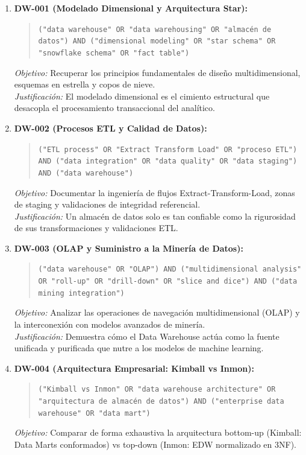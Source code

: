 \begin{enumerate}
  \item \textbf{DW-001 (Modelado Dimensional y Arquitectura Star):}
  \begin{quote}
  \texttt{("data warehouse" OR "data warehousing" OR "almacén de datos") AND ("dimensional modeling" OR "star schema" OR "snowflake schema" OR "fact table")}
  \end{quote}
  \textit{Objetivo:} Recuperar los principios fundamentales de diseño multidimensional, esquemas en estrella y copos de nieve.\\
  \textit{Justificación:} El modelado dimensional es el cimiento estructural que desacopla el procesamiento transaccional del analítico.
  \item \textbf{DW-002 (Procesos ETL y Calidad de Datos):}
  \begin{quote}
  \texttt{("ETL process" OR "Extract Transform Load" OR "proceso ETL") AND ("data integration" OR "data quality" OR "data staging") AND ("data warehouse")}
  \end{quote}
  \textit{Objetivo:} Documentar la ingeniería de flujos Extract-Transform-Load, zonas de staging y validaciones de integridad referencial.\\
  \textit{Justificación:} Un almacén de datos solo es tan confiable como la rigurosidad de sus transformaciones y validaciones ETL.
  \item \textbf{DW-003 (OLAP y Suministro a la Minería de Datos):}
  \begin{quote}
  \texttt{("data warehouse" OR "OLAP") AND ("multidimensional analysis" OR "roll-up" OR "drill-down" OR "slice and dice") AND ("data mining integration")}
  \end{quote}
  \textit{Objetivo:} Analizar las operaciones de navegación multidimensional (OLAP) y la interconexión con modelos avanzados de minería.\\
  \textit{Justificación:} Demuestra cómo el Data Warehouse actúa como la fuente unificada y purificada que nutre a los modelos de machine learning.
  \item \textbf{DW-004 (Arquitectura Empresarial: Kimball vs Inmon):}
  \begin{quote}
  \texttt{("Kimball vs Inmon" OR "data warehouse architecture" OR "arquitectura de almacén de datos") AND ("enterprise data warehouse" OR "data mart")}
  \end{quote}
  \textit{Objetivo:} Comparar de forma exhaustiva la arquitectura bottom-up (Kimball: Data Marts conformados) vs top-down (Inmon: EDW normalizado en 3NF).\\

\end{enumerate}
